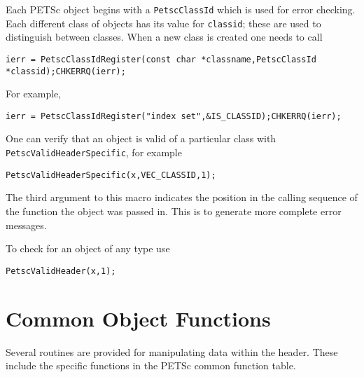 Each PETSc object begins with a \lstinline{PetscClassId} which is used for error checking.
Each different class of objects has its value for \lstinline{classid}; these are used
to distinguish between classes. When a new class is created one needs to call
\begin{lstlisting}
ierr = PetscClassIdRegister(const char *classname,PetscClassId *classid);CHKERRQ(ierr);
\end{lstlisting}
For example,
\begin{lstlisting}
ierr = PetscClassIdRegister("index set",&IS_CLASSID);CHKERRQ(ierr);
\end{lstlisting}
One can verify that an object is valid of a particular class with \lstinline{PetscValidHeaderSpecific}, for example
\begin{lstlisting}
PetscValidHeaderSpecific(x,VEC_CLASSID,1);
\end{lstlisting}
The third argument to this macro indicates the position in the calling sequence of the
function the object was passed in. This is to generate more complete error messages.

To check for an object of any type use
\begin{lstlisting}
PetscValidHeader(x,1);
\end{lstlisting}

\section{Common Object Functions}

Several routines are provided for manipulating data within the header.
These include the specific functions in the PETSc common function table.

